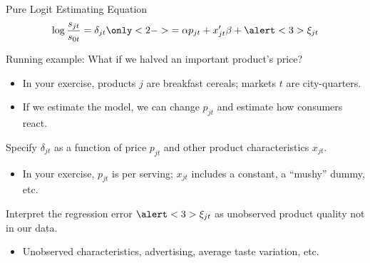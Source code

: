\documentclass[aspectratio=169,t,11pt,table]{beamer}
\begin{document}
\begin{frame}{Pure Logit Estimating Equation}
    \vspace{-\baselineskip}
    \begin{equation*}
        \log\frac{s_{jt}}{s_{0t}} = \delta_{jt} \only<2->{= \alpha p_{jt} + x_{jt}'\beta + \alert<3>{\xi_{jt}}}
    \end{equation*}
    \vspace{-0.5\baselineskip}
    \begin{wideitemize}
        \item Running example: What if we halved an important product's price?
        \begin{itemize}
            \item In your exercise, products $j$ are breakfast cereals; markets $t$ are city-quarters.
            \item If we estimate the model, we can change $p_{jt}$ and estimate how consumers react.
        \end{itemize}
        \pause
        \item Specify $\delta_{jt}$ as a function of price $p_{jt}$ and other product characteristics $x_{jt}$.
        \begin{itemize}
            \item In your exercise, $p_{jt}$ is per serving; $x_{jt}$ includes a constant, a ``mushy'' dummy, etc.
        \end{itemize}
        \pause
        \item Interpret the regression error $\alert<3>{\xi_{jt}}$ as unobserved product quality not in our data.
        \begin{itemize}
            \item Unobserved characteristics, advertising, average taste variation, etc.
        \end{itemize}
    \end{wideitemize}
\end{frame}
\end{document}
